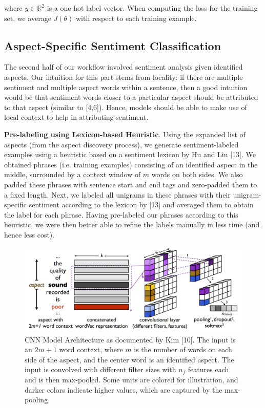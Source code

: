 \documentclass{article} %
\begin{document}
where $y \in \mathbb{R}^2$ is a one-hot label vector. When computing the loss for the training set, we average $J(\theta)$ with respect to each training example.

\subsection{Aspect-Specific Sentiment Classification}
The second half of our workflow involved sentiment analysis given identified aspects. Our intuition for this part stems from locality: if there are multiple sentiment and multiple aspect words within a sentence, then a good intuition would be that sentiment words closer to a particular aspect should be attributed to that aspect (similar to [4,6]). Hence, models should be able to make use of local context to help in attributing sentiment.

\textbf{Pre-labeling using Lexicon-based Heuristic}.
Using the expanded list of aspects (from the aspect discovery process), we generate sentiment-labeled examples using a heuristic based on a sentiment lexicon by Hu and Liu [13]. We obtained phrases (i.e. training examples) consisting of an identified aspect in the middle, surrounded by a context window of $m$ words on both sides. We also padded these phrases with sentence start and end tags and zero-padded them to a fixed length. Next, we labeled all unigrams in these phrases with their unigram-specific sentiment according to the lexicon by [13] and averaged them to obtain the label for each phrase. Having pre-labeled our phrases according to this heuristic, we were then better able to refine the labels manually in less time (and hence less cost).


\begin{figure}[ht]
\begin{center}
\includegraphics[width=.9\columnwidth]{model_architecture2.png}
\end{center}
\caption{CNN Model Architecture as documented by Kim [10]. The input is an $2m+1$ word context, where $m$ is the number of words on each side of the aspect, and the center word is an identified aspect. The input is convolved with different filter sizes with $n_f$ features each and is then max-pooled. Some units are colored for illustration, and darker colors indicate higher values, which are captured by the max-pooling.}
\label{architecture}
\end{figure}
\end{document}
